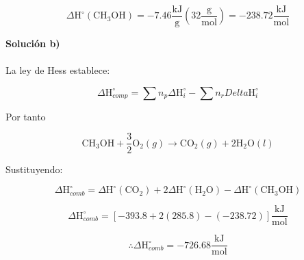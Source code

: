 \documentclass[12pt]{article}
\begin{document}
\begin{displaymath}
	\Delta\mathrm{H}^{\circ}(\mathrm{CH}_3\mathrm{OH})=-7.46\frac{\mathrm{kJ}}{\mathrm{g}} \left( 32 \frac{\mathrm{g}}{\mathrm{mol}} \right) = -238.72 \frac{\mathrm{kJ}}{\mathrm{mol}}
\end{displaymath}

\textbf{Solución b)}\\
\\
La ley de Hess establece:

\begin{displaymath}
	\Delta\mathrm{H}_{comp}^{\circ}=\sum n_p\Delta\mathrm{H}_i^{\circ}-\sum n_r	Delta\mathrm{H}_i^{\circ}
\end{displaymath}

Por tanto

\begin{displaymath}
	\mathrm{CH}_3\mathrm{OH}+\frac{3}{2}\mathrm{O}_2(g) \rightarrow \mathrm{CO}_2(g)+2\mathrm{H}_2\mathrm{O}(l)
\end{displaymath}

Sustituyendo:

\begin{displaymath}
	\Delta\mathrm{H}_{comb}^{\circ}=\Delta\mathrm{H}^{\circ}(\mathrm{CO}_2)+2\Delta\mathrm{H}^{\circ}(\mathrm{H}_2\mathrm{O})-\Delta\mathrm{H}^{\circ}(\mathrm{CH}_3\mathrm{OH})
\end{displaymath}

\begin{displaymath}
	\Delta\mathrm{H}_{comb}^{\circ}=[-393.8+2(285.8)-(-238.72)]\frac{\mathrm{kJ}}{\mathrm{mol}}
\end{displaymath}

\begin{displaymath}
	\therefore \Delta\mathrm{H}_{comb}^{\circ}=-726.68\frac{\mathrm{kJ}}{\mathrm{mol}}
\end{displaymath}
\end{document}
